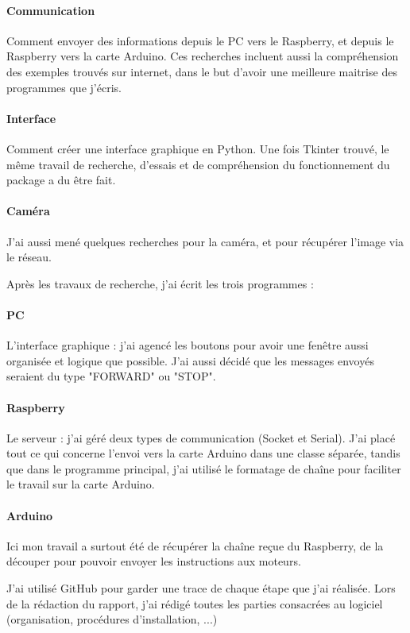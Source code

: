 \documentclass[12pt,a4paper]{report}
\begin{document}
\paragraph{Communication} Comment envoyer des informations depuis le PC vers le Raspberry, et depuis le Raspberry vers la carte Arduino. Ces recherches incluent aussi la compréhension des exemples trouvés sur internet, dans le but d'avoir une meilleure maitrise des programmes que j'écris.

\paragraph{Interface} Comment créer une interface graphique en Python. Une fois Tkinter trouvé, le même travail de recherche, d'essais et de compréhension du fonctionnement du package a du être fait.

\paragraph{Caméra} J'ai aussi mené quelques recherches pour la caméra, et pour récupérer l'image via le réseau.

Après les travaux de recherche, j'ai écrit les trois programmes :

\paragraph{PC} L'interface graphique : j'ai agencé les boutons pour avoir une fenêtre aussi organisée et logique que possible. J'ai aussi décidé que les messages envoyés seraient du type "FORWARD" ou "STOP".

\paragraph{Raspberry} Le serveur : j'ai géré deux types de communication (Socket et Serial). J'ai placé tout ce qui concerne l'envoi vers la carte Arduino dans une classe séparée, tandis que dans le programme principal, j'ai utilisé le formatage de chaîne pour faciliter le travail sur la carte Arduino.

\paragraph{Arduino} Ici mon travail a surtout été de récupérer la chaîne reçue du Raspberry, de la découper pour pouvoir envoyer les instructions aux moteurs.

J'ai utilisé GitHub pour garder une trace de chaque étape que j'ai réalisée. Lors de la rédaction du rapport, j'ai rédigé toutes les parties consacrées au logiciel (organisation, procédures d'installation, ...)
\end{document}
